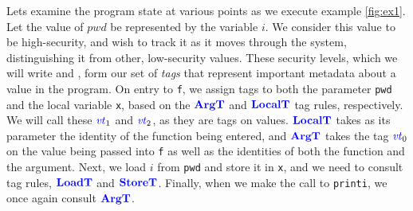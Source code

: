 \documentclass{llncs}
\begin{document}
Lets examine the program state at various points as we execute example \ref{fig:ex1}.
Let the value of \(\mathit{pwd}\) be represented by the variable \(i\). We consider this
value to be high-security, and wish to track it as it moves through the system, distinguishing
it from other, low-security values. These security levels, which we will write \high 
and \low, form our set of {\em tags} that represent important metadata about
a value in the program. On entry to {\tt f}, we assign tags to both the parameter {\tt pwd}
and the local variable {\tt x}, based on the \(\color{blue} \mathbf{ArgT}\) and \(\color{blue} \mathbf{LocalT}\) tag rules,
respectively. We will call these \(\mathit{\color{blue} vt}_1\) and \(\mathit{\color{blue} vt}_2\), as they are tags on values.
\(\color{blue} \mathbf{LocalT}\) takes as its parameter the identity of the function being entered, and \(\color{blue} \mathbf{ArgT}\)
takes the tag \(\mathit{\color{blue} vt}_0\) on the value being passed into {\tt f} as well as the identities of both the
function and the argument. Next, we load \(i\) from {\tt pwd} and store it in {\tt x}, and we need to
consult tag rules, \(\color{blue} \mathbf{LoadT}\) and \(\color{blue} \mathbf{StoreT}\). Finally, when we make the call to
{\tt printi}, we once again consult \(\color{blue} \mathbf{ArgT}\).
\end{document}
